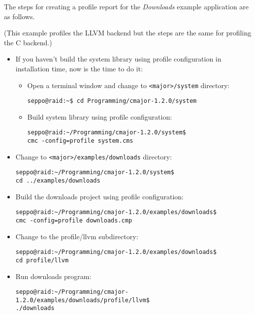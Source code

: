 \documentclass[oneside, a4paper, 11pt]{article}
\begin{document}
The steps for creating a profile report
for the \emph{Downloads} example application are as follows.

(This example profiles the LLVM backend
but the steps are the same for profiling the C backend.)

\begin{itemize}

\item
If you haven't build the system library using profile configuration
in installation time, now is the time to do it:

\begin{itemize}

\item
Open a terminal window and change to \verb|<major>/system| directory:
\begin{verbatim}
seppo@raid:~$ cd Programming/cmajor-1.2.0/system
\end{verbatim}

\item
Build system library using profile configuration:
\begin{verbatim}
seppo@raid:~/Programming/cmajor-1.2.0/system$
cmc -config=profile system.cms
\end{verbatim}

\end{itemize}

\item
Change to \verb|<major>/examples/downloads| directory:
\begin{verbatim}
seppo@raid:~/Programming/cmajor-1.2.0/system$
cd ../examples/downloads
\end{verbatim}

\item
Build the downloads project using profile configuration:
\begin{verbatim}
seppo@raid:~/Programming/cmajor-1.2.0/examples/downloads$
cmc -config=profile downloads.cmp
\end{verbatim}

\item
Change to the profile/llvm subdirectory:
\begin{verbatim}
seppo@raid:~/Programming/cmajor-1.2.0/examples/downloads$
cd profile/llvm
\end{verbatim}

\item
Run downloads program:
\begin{verbatim}
seppo@raid:~/Programming/cmajor-1.2.0/examples/downloads/profile/llvm$
./downloads
\end{verbatim}


\end{itemize}
\end{document}
